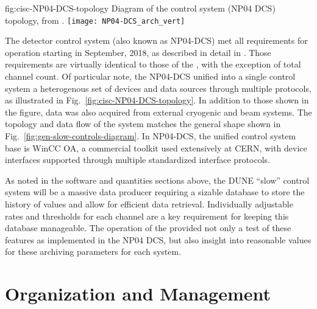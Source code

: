 \begin{dunefigure}{fig:cisc-NP04-DCS-topology}
{Diagram of the  control system (NP04 DCS) topology, from \cite{pdspdcs_proc}.}
\texttt{[image: NP04-DCS\_arch\_vert]}
\end{dunefigure}

The  detector control system (also known as NP04-DCS) met
all requirements for operation starting in September, 2018, as
described in detail in \cite{pdspdcs_proc}.  Those requirements are
virtually identical to those of the , with the exception of
total channel count. Of particular note, the NP04-DCS unified into a
single control system a heterogenous set of devices and data sources
through multiple protocols, as illustrated in
Fig.\ \ref{fig:cisc-NP04-DCS-topology}. In addition to those shown in
the figure, data was also acquired from external cryogenic and beam
systems.  The topology and data flow of the system matches the general
shape shown in Fig.\ \ref{fig:gen-slow-controls-diagram}. In NP04-DCS,
the unified control system base is WinCC OA\cite{winccoa}, a
commercial toolkit used extensively at CERN, with device interfaces
supported through multiple standardized interface protocols.

As noted in the software and quantities sections above, the DUNE ``slow'' control
system will be a massive data producer requiring a sizable database to store the history of values and allow for efficient data retrieval. Individually adjustable rates and thresholds for each channel are a key requirement for keeping this database manageable. The operation of the  provided not only a test of these features as implemented in the NP04 DCS, but also insight into reasonable values for these archiving parameters for each system.


\section{Organization and Management}
\label{sec:cisc-slow-controls-org}

